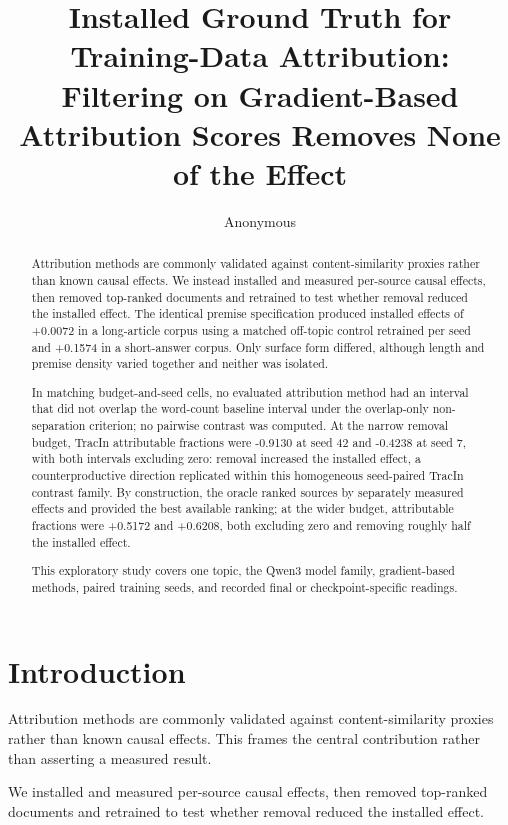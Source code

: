 \documentclass[10pt]{article}
\title{ Installed Ground Truth for Training-Data Attribution: Filtering on Gradient-Based Attribution Scores Removes None of the Effect }
\author{ Anonymous }
\date{}
\begin{document}
\maketitle




\begin{abstract}
Attribution methods are commonly validated against content-similarity proxies rather than known causal effects. We instead installed and measured per-source causal effects, then removed top-ranked documents and retrained to test whether removal reduced the installed effect. The identical premise specification produced installed effects of +0.0072 in a long-article corpus using a matched off-topic control retrained per seed and +0.1574 in a short-answer corpus. Only surface form differed, although length and premise density varied together and neither was isolated.

In matching budget-and-seed cells, no evaluated attribution method had an interval that did not overlap the word-count baseline interval under the overlap-only non-separation criterion; no pairwise contrast was computed. At the narrow removal budget, TracIn attributable fractions were -0.9130 at seed 42 and -0.4238 at seed 7, with both intervals excluding zero: removal increased the installed effect, a counterproductive direction replicated within this homogeneous seed-paired TracIn contrast family. By construction, the oracle ranked sources by separately measured effects and provided the best available ranking; at the wider budget, attributable fractions were +0.5172 and +0.6208, both excluding zero and removing roughly half the installed effect.

This exploratory study covers one topic, the Qwen3 model family, gradient-based methods, paired training seeds, and recorded final or checkpoint-specific readings.


\end{abstract}



\section{ Introduction }
\label{sec:introduction}

Attribution methods are commonly validated against content-similarity proxies rather than known causal effects. This frames the central contribution rather than asserting a measured result.



We installed and measured per-source causal effects, then removed top-ranked documents and retrained to test whether removal reduced the installed effect.
\end{document}
